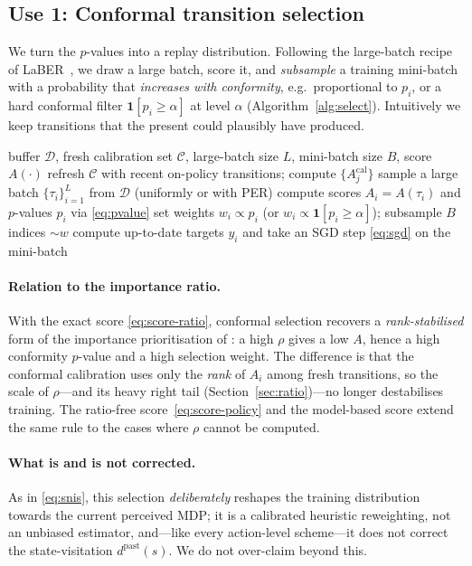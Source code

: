 \documentclass[sigconf]{aamas}
\newcommand{\Dcal}{\mathcal{D}}
\newcommand{\Ccal}{\mathcal{C}}
\newcommand{\indic}[1]{\mathbf{1}\!\left[#1\right]}
\begin{document}
\subsection{Use 1: Conformal transition selection}
\label{sec:selection}
We turn the $p$-values into a replay distribution. Following the large-batch
recipe of LaBER~\cite{lahire2022large}, we draw a large batch, score it, and
\emph{subsample} a training mini-batch with a probability that \emph{increases
with conformity}, e.g.\ proportional to $p_i$, or a hard conformal filter
$\indic{p_i\ge\alpha}$ at level $\alpha$ (Algorithm~\ref{alg:select}). Intuitively
we keep transitions that the present could plausibly have produced.

\begin{algorithm}[t]
\caption{Conformal Likely-Transition Selection (per agent $a$)}
\label{alg:select}
\begin{algorithmic}[1]
\Require buffer $\Dcal$, fresh calibration set $\Ccal$, large-batch size $L$,
mini-batch size $B$, score $A(\cdot)$
  \State refresh $\Ccal$ with recent on-policy transitions; compute
  $\{A^{\mathrm{cal}}_j\}$
  \State sample a large batch $\{\tau_i\}_{i=1}^{L}$ from $\Dcal$ (uniformly or
  with PER)
  \State compute scores $A_i=A(\tau_i)$ and $p$-values $p_i$ via \eqref{eq:pvalue}
  \State set weights $w_i\propto p_i$ (or $w_i\propto\indic{p_i\ge\alpha}$);
  subsample $B$ indices $\sim w$
  \State compute up-to-date targets $y_i$ and take an SGD step \eqref{eq:sgd} on
  the mini-batch
\EndWhile
\end{algorithmic}
\end{algorithm}

\paragraph{Relation to the importance ratio.} With the exact score
\eqref{eq:score-ratio}, conformal selection recovers a \emph{rank-stabilised}
form of the importance prioritisation of \citet{foerster2017stabilising}: a high
$\rho$ gives a low $A$, hence a high conformity $p$-value and a high selection
weight. The difference is that the conformal calibration uses only the
\emph{rank} of $A_i$ among fresh transitions, so the scale of $\rho$---and its
heavy right tail (Section~\ref{sec:ratio})---no longer destabilises training. The
ratio-free score~\eqref{eq:score-policy} and the model-based score extend the
same rule to the cases where $\rho$ cannot be computed.

\paragraph{What is and is not corrected.} As in \eqref{eq:snis}, this selection
\emph{deliberately} reshapes the training distribution towards the current
perceived MDP; it is a calibrated heuristic reweighting, not an unbiased
estimator, and---like every action-level scheme---it does not correct the
state-visitation $d^{\mathrm{past}}(s)$. We do not over-claim beyond this.
\end{document}
